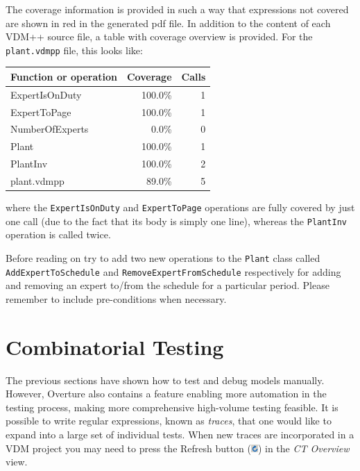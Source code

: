 The coverage information is provided in such a way that expressions not covered are shown in red in the generated pdf file. In addition to the content of each VDM++ source file, a table with coverage overview is provided. For the \texttt{plant.vdmpp} file, this looks like: 

\begin{longtable}{|l|r|r|}
\hline
Function or operation & Coverage & Calls \\
\hline
\hline
ExpertIsOnDuty & 100.0\% & 1 \\
\hline
ExpertToPage & 100.0\% & 1 \\
\hline
NumberOfExperts & 0.0\% & 0 \\
\hline
Plant & 100.0\% & 1 \\
\hline
PlantInv & 100.0\% & 2 \\
\hline
\hline
plant.vdmpp & 89.0\% & 5 \\
\hline
\end{longtable}

\noindent where the \texttt{ExpertIsOnDuty} and \texttt{ExpertToPage} operations are fully covered by just one call (due to the fact that its body is simply one line), whereas the \texttt{PlantInv} operation is called twice.

\begin{myhardexercise}\label{ex:addingfunctionality}
Before reading on try to add two new operations to the \texttt{Plant} class called \texttt{AddExpertToSchedule} and \texttt{RemoveExpertFromSchedule} respectively for adding and removing an expert to/from the schedule for a particular period. Please remember to include pre-conditions when necessary.
\end{myhardexercise}

\newpage

\section{Combinatorial Testing}\label{sec:CT}
The previous sections have shown how to test and debug models manually. However, Overture also contains a feature enabling more automation in the testing process, making more comprehensive high-volume testing feasible. It is possible to write regular expressions, known as \emph{traces}, that one would like to expand into a large set of individual tests. When new traces are incorporated in a VDM project you may need to press the \textsf{Refresh} button
(\includegraphics[width=0.02\textwidth]{figures/refresh}) in the \emph{CT Overview} view.

